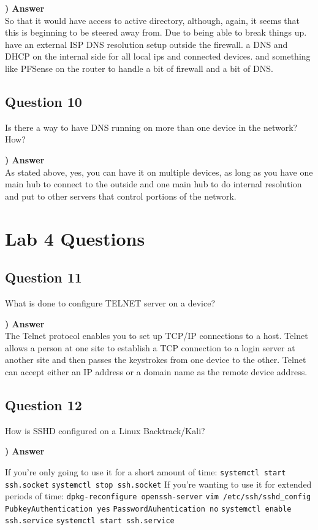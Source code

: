 \documentclass{report}
\newcommand{\mysection}[1]{\section*{#1}}
\newcommand{\mysubsection}[2]{\textbf{\romannumeral #1) #2}}
\begin{document}
\noindent\mysubsection{9}{Answer}
\\So that it would have access to active directory, although, again, it seems that this
is beginning to be steered away from. Due to being able to break things up. have an
external ISP DNS resolution setup outside the firewall. a DNS and DHCP on the internal
side for all local ips and connected devices. and something like PFSense on the router
to handle a bit of firewall and a bit of DNS.

\mysection{\textbf{Question 10}}
Is there a way to have DNS running on more than one device in the network?  How?  

\noindent\mysubsection{10}{Answer}
\\As stated above, yes, you can have it on multiple devices, as long as you have one
main hub to connect to the outside and one main hub to do internal resolution and put
to other servers that control portions of the network.

\chapter*{Lab 4 Questions}

\mysection{\textbf{Question 11}}
What is done to configure TELNET server on a device?

\noindent\mysubsection{11}{Answer}
\\The Telnet protocol enables you to set up TCP/IP connections to a host.
Telnet allows a person at one site to establish a TCP connection to a login 
server at another site and then passes the keystrokes from one device to the 
other. Telnet can accept either an IP address or a domain name as the remote 
device address.

\mysection{\textbf{Question 12}}
How is SSHD configured on a Linux Backtrack/Kali?

\noindent\mysubsection{12}{Answer}


\begin{outline}
	\centering
	\1 If you're only going to use it for a short amount of time:
		\2 \verb$systemctl start ssh.socket$
		\2 \verb$systemctl stop ssh.socket$
	\1 If you're wanting to use it for extended periods of time:
		\2 \verb$dpkg-reconfigure openssh-server$
		\2 \verb$vim /etc/ssh/sshd_config$
		\2 \verb$PubkeyAuthentication yes$
		\2 \verb$PasswordAuhentication no$
		\2 \verb$systemctl enable ssh.service$
		\2 \verb$systemctl start ssh.service$
\end{outline}
\end{document}
